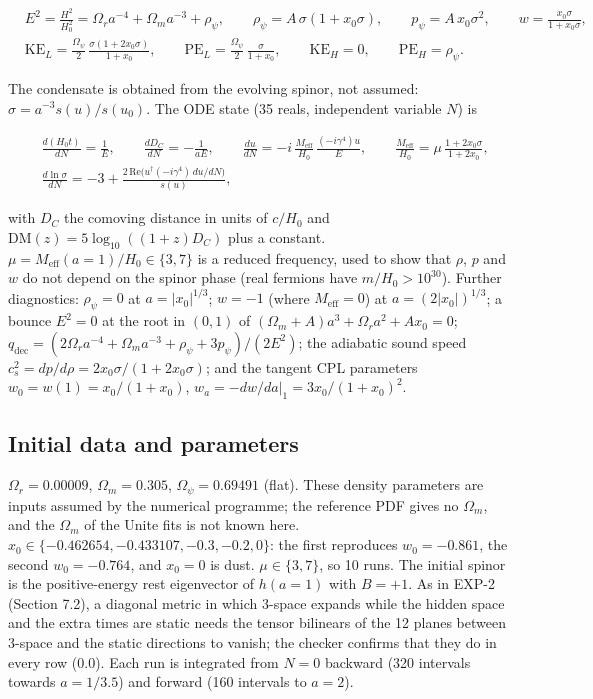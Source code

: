 \documentclass[11pt]{article}
\begin{document}
\[
\begin{aligned}
&E^2=\frac{H^2}{H_0^2}=\Omega_ra^{-4}+\Omega_ma^{-3}+\rho_\psi,\qquad \rho_\psi=A\,\sigma(1+x_0\sigma),\qquad p_\psi=A\,x_0\sigma^2,\qquad w=\frac{x_0\sigma}{1+x_0\sigma},\\
&\mathrm{KE}_L=\frac{\Omega_\psi}{2}\,\frac{\sigma(1+2x_0\sigma)}{1+x_0},\qquad \mathrm{PE}_L=\frac{\Omega_\psi}{2}\,\frac{\sigma}{1+x_0},\qquad \mathrm{KE}_H=0,\qquad \mathrm{PE}_H=\rho_\psi .
\end{aligned}
\]

The condensate is obtained from the evolving spinor, not assumed: $\sigma=a^{-3}s(u)/s(u_0)$. The ODE state (35 reals, independent variable $N$) is

\[
\begin{aligned}
&\frac{d(H_0t)}{dN}=\frac1E,\qquad \frac{dD_C}{dN}=-\frac{1}{aE},\qquad \frac{du}{dN}=-i\,\frac{M_{\mathrm{eff}}}{H_0}\,\frac{(-i\gamma^4)u}{E},\qquad \frac{M_{\mathrm{eff}}}{H_0}=\mu\,\frac{1+2x_0\sigma}{1+2x_0},\\
&\frac{d\ln\sigma}{dN}=-3+\frac{2\,\mathrm{Re}\bigl(u^\dagger(-i\gamma^4)\,du/dN\bigr)}{s(u)},
\end{aligned}
\]

with $D_C$ the comoving distance in units of $c/H_0$ and $\mathrm{DM}(z)=5\log_{10}((1+z)D_C)$ plus a constant. $\mu=M_{\mathrm{eff}}(a=1)/H_0\in\{3,7\}$ is a reduced frequency, used to show that $\rho$, $p$ and $w$ do not depend on the spinor phase (real fermions have $m/H_0>10^{30}$). Further diagnostics: $\rho_\psi=0$ at $a=|x_0|^{1/3}$; $w=-1$ (where $M_{\mathrm{eff}}=0$) at $a=(2|x_0|)^{1/3}$; a bounce $E^2=0$ at the root in $(0,1)$ of $(\Omega_m+A)a^3+\Omega_ra^2+Ax_0=0$; $q_{\mathrm{dec}}=(2\Omega_ra^{-4}+\Omega_ma^{-3}+\rho_\psi+3p_\psi)/(2E^2)$; the adiabatic sound speed $c_s^2=dp/d\rho=2x_0\sigma/(1+2x_0\sigma)$; and the tangent CPL parameters $w_0=w(1)=x_0/(1+x_0)$, $w_a=-dw/da|_1=3x_0/(1+x_0)^2$.

\subsection{Initial data and parameters}

$\Omega_r=0.00009$, $\Omega_m=0.305$, $\Omega_\psi=0.69491$ (flat). These density parameters are inputs assumed by the numerical programme; the reference PDF gives no $\Omega_m$, and the $\Omega_m$ of the Unite fits is not known here. $x_0\in\{-0.462654,-0.433107,-0.3,-0.2,0\}$: the first reproduces $w_0=-0.861$, the second $w_0=-0.764$, and $x_0=0$ is dust. $\mu\in\{3,7\}$, so 10 runs. The initial spinor is the positive-energy rest eigenvector of $h(a=1)$ with $B=+1$. As in EXP-2 (Section 7.2), a diagonal metric in which 3-space expands while the hidden space and the extra times are static needs the tensor bilinears of the 12 planes between 3-space and the static directions to vanish; the checker confirms that they do in every row (0.0). Each run is integrated from $N=0$ backward (320 intervals towards $a=1/3.5$) and forward (160 intervals to $a=2$).
\end{document}
